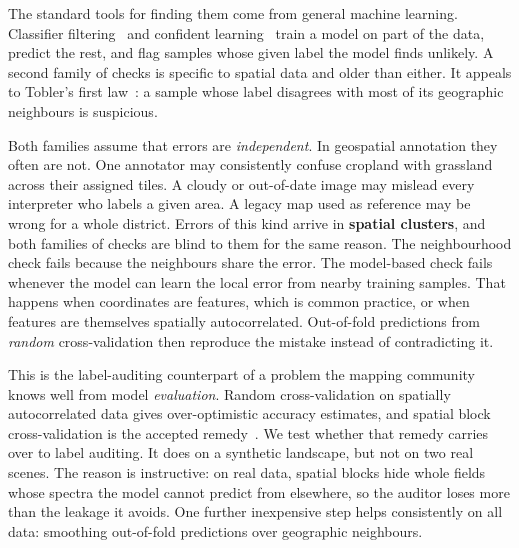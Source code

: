 \documentclass[11pt]{article}
\begin{document}
The standard tools for finding them come from general machine learning. Classifier
filtering~\citep{brodley1999identifying} and confident
learning~\citep{northcutt2021confident} train a model on part of the data,
predict the rest, and flag samples whose given label the model finds unlikely. A
second family of checks is specific to spatial data and older than either. It
appeals to Tobler's first law~\citep{tobler1970computer}: a sample whose label
disagrees with most of its geographic neighbours is suspicious.

Both families assume that errors are \emph{independent}. In geospatial annotation
they often are not. One annotator may consistently confuse cropland with grassland
across their assigned tiles. A cloudy or out-of-date image may mislead every
interpreter who labels a given area. A legacy map used as reference may be wrong
for a whole district. Errors of this kind arrive in \textbf{spatial clusters}, and
both families of checks are blind to them for the same reason. The neighbourhood
check fails because the neighbours share the error. The model-based check fails
whenever the model can learn the local error from nearby training samples. That
happens when coordinates are features, which is common practice, or when features
are themselves spatially autocorrelated. Out-of-fold predictions from
\emph{random} cross-validation then reproduce the mistake instead of contradicting it.

This is the label-auditing counterpart of a problem the mapping community knows
well from model \emph{evaluation}. Random cross-validation on spatially
autocorrelated data gives over-optimistic accuracy estimates, and spatial block
cross-validation is the accepted remedy~\citep{roberts2017cross,valavi2019blockcv,ploton2020spatial,meyer2019importance}.
We test whether that remedy carries over to label auditing. It does on a
synthetic landscape, but not on two real scenes. The reason is instructive: on
real data, spatial blocks hide whole fields whose spectra the model cannot
predict from elsewhere, so the auditor loses more than the leakage it avoids. One
further inexpensive step helps consistently on all data: smoothing out-of-fold
predictions over geographic neighbours.
\end{document}
